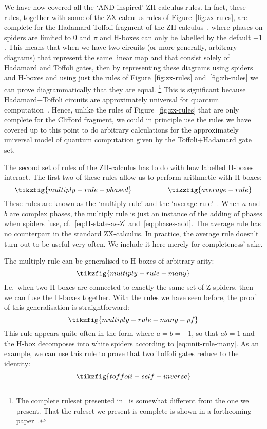 \documentclass[a4paper,onecolumn,superscriptaddress,11pt,%
				unpublished,%
				allowfontchageintitle,%
				]{quantumarticle}
\begin{document}
We have now covered all the `AND inspired' ZH-calculus rules. In fact, these rules, together with some of the ZX-calculus rules of Figure~\ref{fig:zx-rules}, are complete for the Hadamard-Toffoli fragment of the ZH-calculus~\cite{zhphasefree}, where phases on spiders are limited to $0$ and $\pi$ and H-boxes can only be labelled by the default $-1$.
This means that when we have two circuits (or more generally, arbitrary diagrams) that represent the same linear map and that consist solely of Hadamard and Toffoli gates, then by representing these diagrams using spiders and H-boxes and using just the rules of Figure~\ref{fig:zx-rules} and~\ref{fig:zh-rules} we can prove diagrammatically that they are equal.%
\footnote{The complete ruleset presented in~\cite{zhphasefree} is somewhat different from the one we present. That the ruleset we present is complete is shown in a forthcoming paper~\cite{zhcompleteness2020}.}
This is significant because Hadamard+Toffoli circuits are approximately universal for quantum computation~\cite{ShiToffoliHadamard,aharonov2003simple}.
Hence, unlike the rules of Figure~\ref{fig:zx-rules} that are only complete for the Clifford fragment, we could in principle use the rules we have covered up to this point to do arbitrary calculations for the approximately universal model of quantum computation given by the Toffoli+Hadamard gate set.

The second set of rules of the ZH-calculus has to do with how labelled H-boxes interact.
The first two of these rules allow us to perform arithmetic with H-boxes:
\begin{equation}\label{eq:multiply-average}
	\tikzfig{multiply-rule-phased} \qquad\qquad \quad \tikzfig{average-rule}
\end{equation}
These rules are known as the `multiply rule' and the `average rule'~\cite{backens2018zhcalculus}.
When $a$ and $b$ are complex phases, the multiply rule is just an instance of the adding of phases when spiders fuse, cf.~\eqref{eq:H-state-as-Z} and~\eqref{eq:phases-add}.
The average rule has no counterpart in the standard ZX-calculus. In practice, the average rule doesn't turn out to be useful very often. We include it here merely for completeness' sake.

The multiply rule can be generalised to H-boxes of arbitrary arity:
\begin{equation}\label{eq:mult-rule-many}
	\tikzfig{multiply-rule-many}
\end{equation}
I.e.~when two H-boxes are connected to exactly the same set of Z-spiders, then we can fuse the H-boxes together.
With the rules we have seen before, the proof of this generalisation is straightforward:
\begin{equation}
\tikzfig{multiply-rule-many-pf}
\end{equation}
This rule appears quite often in the form where $a=b=-1$, so that $ab=1$ and the H-box decomposes into white spiders according to \eqref{eq:unit-rule-many}.
As an example, we can use this rule to prove that two Toffoli gates reduce to the identity:
\begin{equation}
\tikzfig{toffoli-self-inverse}
\end{equation}
\end{document}

